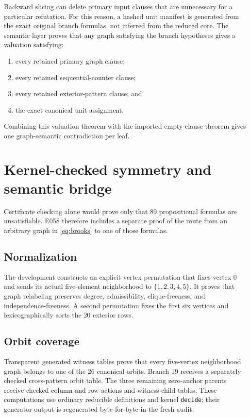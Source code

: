 \documentclass[11pt,reqno,a4paper]{amsart}
\theoremstyle{definition}
\theoremstyle{remark}
\newcommand{\code}[1]{\texttt{#1}}
\begin{document}
Backward slicing can delete primary input clauses that are unnecessary for a
particular refutation.  For this reason, a hashed unit manifest is generated
from the exact original branch formulas, not inferred from the reduced core.
The semantic layer proves that any graph satisfying the branch hypotheses
gives a valuation satisfying:
\begin{enumerate}[leftmargin=2.2em]
\item every retained primary graph clause;
\item every retained sequential-counter clause;
\item every retained exterior-pattern clause; and
\item the exact canonical unit assignment.
\end{enumerate}
Combining this valuation theorem with the imported empty-clause theorem gives
one graph-semantic contradiction per leaf.

\section{Kernel-checked symmetry and semantic bridge}\label{sec:bridge}

Certificate checking alone would prove only that 89 propositional formulas
are unsatisfiable.  E058 therefore includes a separate proof of the route
from an arbitrary graph in \eqref{eq:brooks} to one of those formulas.

\subsection{Normalization}

The development constructs an explicit vertex permutation that fixes vertex
0 and sends its actual five-element neighborhood to
\(\{1,2,3,4,5\}\).  It proves that graph relabeling preserves degree,
admissibility, clique-freeness, and independence-freeness.  A second
permutation fixes the first six vertices and lexicographically sorts the 20
exterior rows.

\subsection{Orbit coverage}

Transparent generated witness tables prove that every five-vertex
neighborhood graph belongs to one of the 26 canonical orbits.  Branch 19
receives a separately checked cross-pattern orbit table.  The three remaining
zero-anchor parents receive checked column and row actions and witness-child
tables.  These computations use ordinary reducible definitions and kernel
\code{decide}; their generator output is regenerated byte-for-byte in the
fresh audit.
\end{document}
